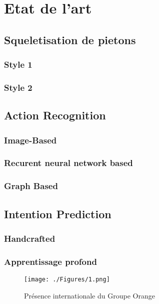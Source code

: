 \clearpage
\section{Etat de l'art}
\label{sec:SOTA}

\subsection{Squeletisation de pietons}
\label{subsec:SQUEL}
\subsubsection{Style 1}
\subsubsection{Style 2}

\subsection{Action Recognition}
\label{subsec:HAR}

\subsubsection{Image-Based}
\subsubsection{Recurent neural network based}
\subsubsection{Graph Based}

\subsection{Intention Prediction}
\subsubsection{Handcrafted}
\subsubsection{Apprentissage profond}





\begin{figure}[htbp]
    \texttt{[image: ./Figures/1.png]}
    \caption{Présence internationale du Groupe Orange}
    \label{fig:UoC}
\end{figure}

